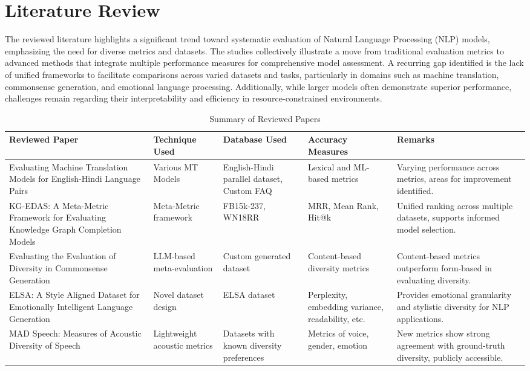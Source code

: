 \documentclass[conference]{IEEEtran}
\begin{document}
\section{Literature Review}
\hspace{}The reviewed literature highlights a significant trend toward systematic evaluation of Natural Language Processing (NLP) models, emphasizing the need for diverse metrics and datasets. The studies collectively illustrate a move from traditional evaluation metrics to advanced methods that integrate multiple performance measures for comprehensive model assessment. A recurring gap identified is the lack of unified frameworks to facilitate comparisons across varied datasets and tasks, particularly in domains such as machine translation, commonsense generation, and emotional language processing. Additionally, while larger models often demonstrate superior performance, challenges remain regarding their interpretability and efficiency in resource-constrained environments.

\begin{table}[h]
    \centering
    \begin{tabular}{|p{1.3cm}|p{1.3cm}|p{1.3cm}|p{1.3cm}|p{1.3cm}|}
        \hline
        \textbf{Reviewed Paper} & \textbf{Technique Used} & \textbf{Database Used} & \textbf{Accuracy Measures} & \textbf{Remarks} \\
        \hline
        Evaluating Machine Translation Models for English-Hindi Language Pairs & Various MT Models & English-Hindi parallel dataset, Custom FAQ & Lexical and ML-based metrics & Varying performance across metrics, areas for improvement identified. \\
        \hline
        KG-EDAS: A Meta-Metric Framework for Evaluating Knowledge Graph Completion Models & Meta-Metric framework & FB15k-237, WN18RR & MRR, Mean Rank, Hit@k & Unified ranking across multiple datasets, supports informed model selection. \\
        \hline
        Evaluating the Evaluation of Diversity in Commonsense Generation & LLM-based meta-evaluation & Custom generated dataset & Content-based diversity metrics & Content-based metrics outperform form-based in evaluating diversity. \\
        \hline
        ELSA: A Style Aligned Dataset for Emotionally Intelligent Language Generation & Novel dataset design & ELSA dataset & Perplexity, embedding variance, readability, etc. & Provides emotional granularity and stylistic diversity for NLP applications. \\
        \hline
        MAD Speech: Measures of Acoustic Diversity of Speech & Lightweight acoustic metrics & Datasets with known diversity preferences & Metrics of voice, gender, emotion & New metrics show strong agreement with ground-truth diversity, publicly accessible. \\
        \hline
    \end{tabular}
    \caption{Summary of Reviewed Papers}
    \label{tab:reviewed_papers}
\end{table}
\end{document}
